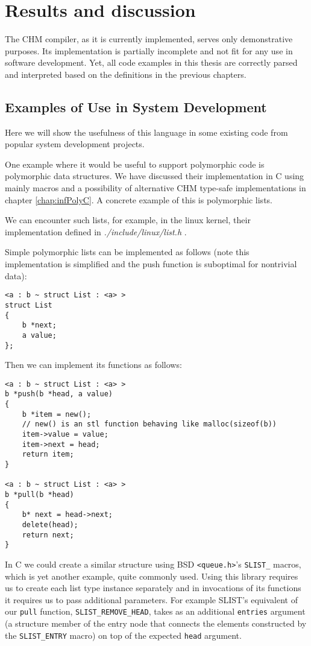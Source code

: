 
\chapter{Results and discussion}

The CHM compiler, as it is currently implemented, serves only demonstrative purposes. Its implementation is partially incomplete and not fit for any use in software development. Yet, all code examples in this thesis are correctly parsed and interpreted based on the definitions in the previous chapters.

\section{Examples of Use in System Development}

Here we will show the usefulness of this language in some existing code from popular system development projects.

One example where it would be useful to support polymorphic code is polymorphic data structures. We have discussed their implementation in C using mainly macros and a possibility of alternative CHM type-safe implementations in chapter \ref{chap:infPolyC}. A concrete example of this is polymorphic lists.

We can encounter such lists, for example, in the linux kernel, their implementation defined in \emph{./include/linux/list.h} \cite{torvalds2018linux}.

Simple polymorphic lists can be implemented as follows (note this implementation is simplified and the push function is suboptimal for nontrivial data):

\begin{lstlisting}
<a : b ~ struct List : <a> >
struct List
{
    b *next;
    a value;
};
\end{lstlisting}

Then we can implement its functions as follows:

\begin{lstlisting}
<a : b ~ struct List : <a> >
b *push(b *head, a value)
{
    b *item = new();
    // new() is an stl function behaving like malloc(sizeof(b))
    item->value = value;
    item->next = head;
    return item;
}

<a : b ~ struct List : <a> >
b *pull(b *head)
{
    b* next = head->next;
    delete(head);
    return next;
}
\end{lstlisting}

In C we could create a similar structure using BSD \lstinline{<queue.h>}'s \cite{pages2007queue} \lstinline{SLIST_} macros, which is yet another example, quite commonly used. Using this library requires us to create each list type instance separately and in invocations of its functions it requires us to pass additional parameters. For example SLIST's equivalent of our \lstinline{pull} function, \lstinline{SLIST_REMOVE_HEAD}, takes as an additional \lstinline{entries} argument (a structure member of the entry node that connects the elements constructed by the \lstinline{SLIST_ENTRY} macro) on top of the expected \lstinline{head} argument.

